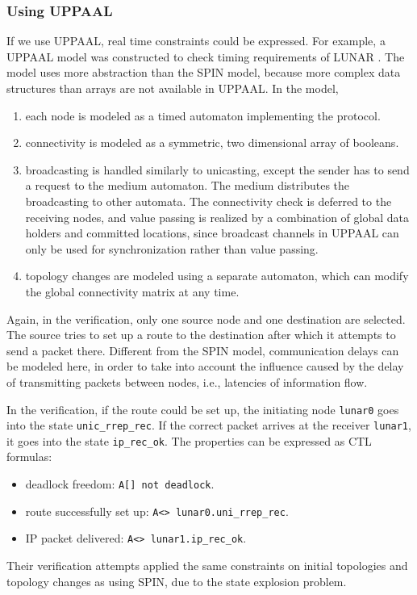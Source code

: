 \documentclass[a4paper,10pt,twocolumn]{article}
\begin{document}
\subsubsection{Using UPPAAL}
If we use UPPAAL, real time constraints could be expressed. For example, a UPPAAL model was constructed to check timing requirements of LUNAR \cite{WPP04}. The model uses more abstraction than the SPIN model, because more complex data structures than arrays are not available in UPPAAL. In the model,
\begin{enumerate}
  \item each node is modeled as a timed automaton implementing the protocol.
  \item connectivity is modeled as a symmetric, two dimensional array of booleans.
  \item broadcasting is handled similarly to unicasting, except the sender has to send a request to the medium automaton. The medium distributes the broadcasting to other automata. The connectivity check is deferred to the receiving nodes, and value passing is realized by a combination of global data holders and committed locations, since broadcast channels in UPPAAL can only be used for synchronization rather than value passing.
  \item topology changes are modeled using a separate automaton, which can modify the global connectivity matrix at any time.
\end{enumerate}
Again, in the verification, only one source node and one destination are selected. The source tries to set up a route to the destination after which it attempts to send a packet there. Different from the SPIN model, communication delays can be modeled here, in order to take into account the influence caused by the delay of transmitting packets between nodes, i.e., latencies of information flow.

In the verification, if the route could be set up, the initiating node \verb=lunar0= goes into the state \verb=unic_rrep_rec=. If the correct packet arrives at the receiver \verb=lunar1=, it goes into the state \verb=ip_rec_ok=. The properties can be expressed as CTL formulas:
\begin{itemize}
  \item deadlock freedom: \verb=A[] not deadlock=.
  \item route successfully set up: \verb=A<> lunar0.uni_rrep_rec=.
  \item IP packet delivered: \verb=A<> lunar1.ip_rec_ok=.
\end{itemize}
Their verification attempts applied the same constraints on initial topologies and topology changes as using SPIN, due to the state explosion problem.
\end{document}
